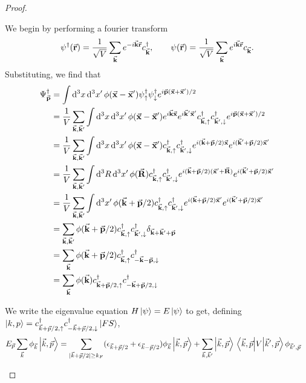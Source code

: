 \begin{proof}
	\begin{parts}
	\item We begin by performing a fourier transform
		\[
			\psi^\dagger(\va r)=\frac{1}{\sqrt{V} }\sum_{\va k}e^{-i\va k \va r}c_{\va k}^\dagger,\qquad \psi(\va r) = \frac{1}{\sqrt{V} }\sum_{\va k} e^{i\va k \va r}c_{\va k}
		.\] 
		Substituting, we find that
		\begin{align*}
			\Psi_{\va p}^\dagger &= \int \dd[3]{x}\dd[3]{x'} \phi(\va x - \va x')\psi_{\uparrow}^\dagger \psi_{\downarrow}^\dagger e^{i\va p(\va x + \va x') / 2} \\
					     &= \frac{1}{V}\sum_{\va k, \va k'}\int \dd[3]{x}\dd[3]{x'}\phi(\va x - \va x') e^{i\va k \va x}e^{i\va k'\va x'}c^\dagger_{\va k, \uparrow} c^\dagger_{\va k', \downarrow} e^{i\va p (\va x + \va x') / 2}\\
					     &= \frac{1}{V}\sum_{\va k, \va k'}\int \dd[3]{x}\dd[3]{x'}\phi(\va x - \va x') c^\dagger_{\va k, \uparrow} c^\dagger_{\va k', \downarrow} e^{i(\va k + \va p / 2)\va x}e^{i(\va k' + \va p / 2)\va x'}\\
					     &= \frac{1}{V}\sum_{\va k, \va k'}\int \dd[3]{R}\dd[3]{x'}\phi(\va R) c^\dagger_{\va k, \uparrow} c^\dagger_{\va k', \downarrow} e^{i(\va k + \va p / 2)(\va x'+\va R)}e^{i(\va k' + \va p / 2)\va x'}\\
					     &= \frac{1}{V}\sum_{\va k, \va k'}\int \dd[3]{x'}\phi(\va k + \va p / 2) c^\dagger_{\va k, \uparrow} c^\dagger_{\va k', \downarrow} e^{i(\va k + \va p / 2)\va x'}e^{i(\va k' + \va p / 2)\va x'}\\
					     &= \sum_{\va k, \va k'}\phi(\va k + \va p / 2) c^\dagger_{\va k, \uparrow} c^\dagger_{\va k', \downarrow}\delta_{\va k + \va k' + \va p}\\ 
					     &= \sum_{\va k}\phi(\va k + \va p / 2) c^\dagger_{\va k, \uparrow} c^\dagger_{-\va k - \va p, \downarrow}\\
					     &= \sum_{\va k}\phi(\va k) c^\dagger_{\va k + \va p / 2, \uparrow} c^\dagger_{-\va k + \va p / 2, \downarrow}\\
		\end{align*}
		\item We write the eigenvalue equation $H\ket{\psi} = E\ket{\psi}$ to get, defining $\ket{k,p} = c^\dagger_{\vec{k}+\vec{p}/2,\uparrow} c^\dagger_{-\vec{k}+\vec{p}/2,\downarrow}\ket{FS}$,
		\begin{align*}
			E_{\vec{p}}\sum_{\vec k}\phi_{\vec{k}} \ket{\vec{k}, \vec{p}} &= \sum_{|\vec{k} + \vec{p}/2|\ge k_F} (\epsilon_{\vec{k}+\vec{p}/2}+\epsilon_{\vec{k}-\vec{p}/2})\phi_{\vec{k}}\ket{\vec{k},\vec{p}}+\sum_{\vec{k},\vec{k}'}\ket{\vec{k},\vec{p}}\mel{\vec{k},\vec{p}}{V}{\vec{k}',\vec{p}}\phi_{\vec{k}',\vec{p}}
		\end{align*}
	\end{parts}
\end{proof}
